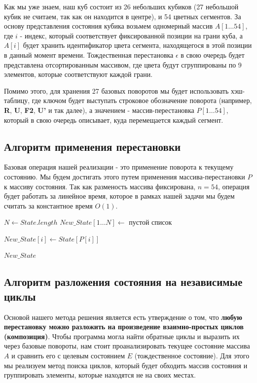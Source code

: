 \documentclass{article}
\begin{document}
Как мы уже знаем, наш куб состоит из 26 небольших кубиков (27 небольшой кубик не считаем, так как он находится в центре), и 54 цветных сегментов. За основу представления состояния кубика возьмем одномерный массив $A[1\dots54]$, где $i$ - индекс, который соответствует фиксированной позиции на грани куба, а $A[i]$ будет хранить идентификатор цвета сегмента, находящегося в этой позиции в данный момент времени. Тождественная перестановка $\epsilon$ в свою очередь будет представлена отсортированным массивом, где цвета будут сгруппированы по 9 элементов, которые соответствуют каждой грани.

Помимо этого, для хранения 27 базовых поворотов мы будет использовать хэш-таблицу, где ключом будет выступать строковое обозначение поворота (например, \textbf{R}, \textbf{U}, \textbf{F2}, \textbf{U'} и так далее), а значением - массив-перестановка $P[1\dots54]$, который в свою очередь описывает, куда перемещается каждый сегмент.

\subsection{Алгоритм применения перестановки}
Базовая операция нашей реализации - это применение поворота к текущему состоянию. Мы будем достигать этого путем применения массива-перестановки $P$ к массиву состояния. Так как разменость массива фиксирована, $n = 54$, операция будет работать за линейное время, которое в рамках нашей задачи мы будем считать за константное время $O(1)$.

\begin{algorithm}
\caption{Применение перестановки к состоянию куба}
\begin{algorithmic}[1]

\State $N\gets State.length$
\State $New\_State[1\dots N]\gets\textbf{ пустой список}$

\State $New\_State[i]\gets State[P[i]]$
\EndFor

\Return $New\_State$

\EndProcedure
\end{algorithmic}
\end{algorithm}

\subsection{Алгоритм разложения состояния на независимые циклы}
Основой нашего метода решения является есть утверждение о том, что \textbf{любую перестановку можно разложить на произведение взаимно-простых циклов (композиция)}. Чтобы программа могла найти обратные циклы и выразить их через базовые повороты, нам стоит проанализировать текущее состояние массива $A$ и сравнить его с целевым состоянием $E$ (тождественное состояние). Для этого мы реализуем метод поиска циклов, который будет обходить массив состояния и группировать элементы, которые находятся не на своих местах.
\end{document}

